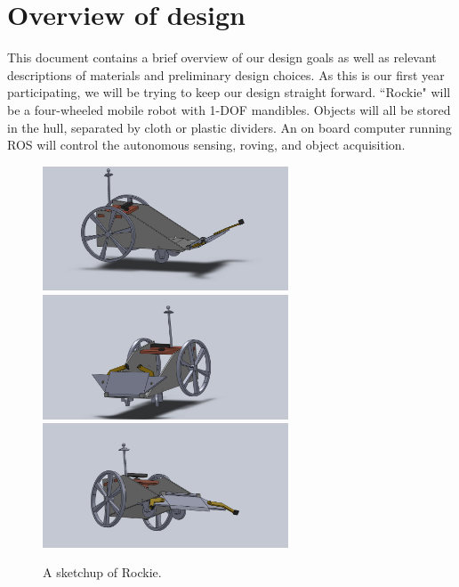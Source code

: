 \documentclass{paper}
\newcommand \robotName{Rockie} 		%
\begin{document}
\maketitle


\section*{Overview of design}

	This document contains a brief overview of our design goals as well as relevant descriptions of materials and preliminary design choices.  As this is our first year participating, we will be trying to keep our design straight forward.  ``\robotName" will be a four-wheeled mobile robot with 1-DOF mandibles.  Objects will all be stored in the hull, separated by cloth or plastic dividers.   An on board computer running ROS will control the autonomous sensing, roving, and object acquisition.   

\begin{figure}[h]
\centering
\includegraphics[width=0.65\textwidth]{fig/robot_assemble_scoop.JPG} \\ 
\includegraphics[width=0.65\textwidth]{fig/robot_assemble_scoop_2.JPG} \\
\includegraphics[width=0.65\textwidth]{fig/robot_assemble_scoop_4.JPG}
\caption{A sketchup of \robotName. }
\label{fig:sketchup}
\end{figure}
\end{document}
